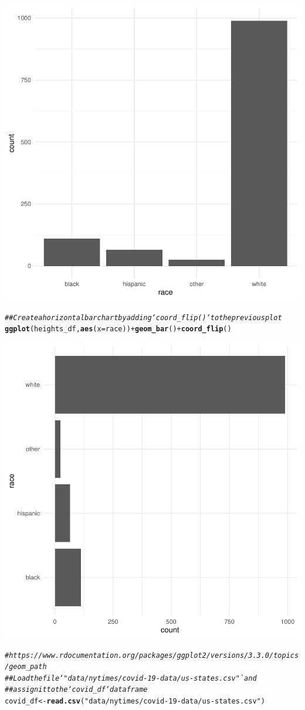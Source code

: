 \documentclass{article}\usepackage[]{graphicx}\usepackage[]{xcolor}
\makeatletter
\newcommand{\hlstr}[1]{\textcolor[rgb]{0.192,0.494,0.8}{#1}}%
\newcommand{\hlcom}[1]{\textcolor[rgb]{0.678,0.584,0.686}{\textit{#1}}}%
\newcommand{\hlopt}[1]{\textcolor[rgb]{0,0,0}{#1}}%
\newcommand{\hlstd}[1]{\textcolor[rgb]{0.345,0.345,0.345}{#1}}%
\newcommand{\hlkwb}[1]{\textcolor[rgb]{0.69,0.353,0.396}{#1}}%
\newcommand{\hlkwc}[1]{\textcolor[rgb]{0.333,0.667,0.333}{#1}}%
\newcommand{\hlkwd}[1]{\textcolor[rgb]{0.737,0.353,0.396}{\textbf{#1}}}%
\newenvironment{kframe}{%
 \def\at@end@of@kframe{}%
 \ifinner\ifhmode%
  \def\at@end@of@kframe{\end{minipage}}%
  \begin{minipage}{\columnwidth}%
 \fi\fi%
 \def\FrameCommand##1{\hskip\@totalleftmargin \hskip-\fboxsep
 \colorbox{shadecolor}{##1}\hskip-\fboxsep
     \hskip-\linewidth \hskip-\@totalleftmargin \hskip\columnwidth}%
 \MakeFramed {\advance\hsize-\width
   \@totalleftmargin\z@ \linewidth\hsize
   \@setminipage}}%
 {\par\unskip\endMakeFramed%
 \at@end@of@kframe}
\newenvironment{knitrout}{}{} %
\makeatother
\begin{document}
\begin{knitrout}
{\centering \includegraphics[width=.6\linewidth]{figure/assignment-04-Quintero-Vasquez-Johnatan-Rnwauto-report-4} 

}


\begin{kframe}\begin{alltt}
\hlcom{## Create a horizontal bar chart by adding `coord_flip()` to the previous plot}
\hlkwd{ggplot}\hlstd{(heights_df,} \hlkwd{aes}\hlstd{(}\hlkwc{x} \hlstd{= race))} \hlopt{+} \hlkwd{geom_bar}\hlstd{()} \hlopt{+} \hlkwd{coord_flip}\hlstd{()}
\end{alltt}
\end{kframe}

{\centering \includegraphics[width=.6\linewidth]{figure/assignment-04-Quintero-Vasquez-Johnatan-Rnwauto-report-5} 

}


\begin{kframe}\begin{alltt}
\hlcom{# https://www.rdocumentation.org/packages/ggplot2/versions/3.3.0/topics/geom_path}
\hlcom{## Load the file `"data/nytimes/covid-19-data/us-states.csv"` and}
\hlcom{## assign it to the `covid_df` dataframe}
\hlstd{covid_df} \hlkwb{<-} \hlkwd{read.csv}\hlstd{(}\hlstr{"data/nytimes/covid-19-data/us-states.csv"}\hlstd{)}


\end{alltt}
\end{kframe}
\end{knitrout}
\end{document}

